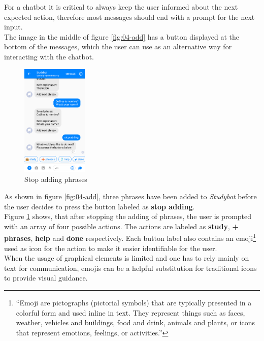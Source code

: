 For a chatbot it is critical to always keep the user informed about the next expected action,
therefore most messages should end with a prompt for the next input.
\\

The image in the middle of figure \ref{fig:04-add} has a button displayed at the bottom of the messages,
which the user can use as an alternative way for interacting with the chatbot.
\\

\begin{figure}
  \centering
  \includegraphics[width=0.28\textwidth]{images/interface/05-stop-adding.png}
	\caption{Stop adding phrases}
	\label{fig:05-stop-adding}
\end{figure}

As shown in figure \ref{fig:04-add}, three phrases have been added to \emph{Studybot}
before the user decides to press the button labeled as \textbf{stop adding}.
\\
Figure \ref{fig:05-stop-adding} shows, that after stopping the adding of phrases, the user is prompted with an array of four possible actions.
The actions are labeled as \textbf{study}, \textbf{+ phrases}, \textbf{help} and \textbf{done} respectively.
Each button label also contains an emoji\footnote{``Emoji are pictographs (pictorial symbols) that are typically presented in a colorful form and used inline in text. They represent things such as faces, weather, vehicles and buildings, food and drink, animals and plants, or icons that represent emotions, feelings, or activities.''\cite{emoji}} used as icon for the action to make it easier identifiable for the user.
\\
When the usage of graphical elements is limited and one has to rely mainly on text for communication,
emojis can be a helpful substitution for traditional icons to provide visual guidance.
\\

